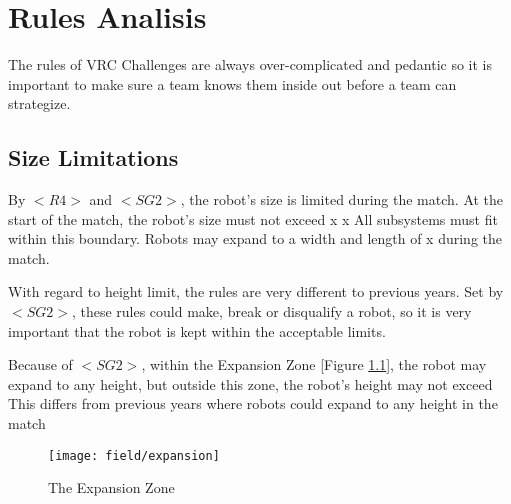 \documentclass[../main.tex]{subfiles}
\begin{document}
\chapter{Rules Analisis}

The rules of VRC Challenges are always over-complicated and pedantic
so it is important to make sure a team knows them inside out before a team can
strategize.

\section{Size Limitations}

By $<R4>$ and $<SG2>$, the robot’s size is limited during the match. 
At the start of the match, the robot’s size must not exceed  x  x  
All subsystems must fit within this boundary.
Robots may expand to a width and length of  x  during the match. \par

With regard to height limit, the rules are very different to previous years.
Set by $<SG2>$, these rules could make, break or disqualify a robot,
so it is very important that the robot is kept within the acceptable limits. \par

Because of $<SG2>$, within the Expansion Zone [Figure \ref{fig:expansionzone}], the robot may expand to any height,
but outside this zone, the robot’s height may not exceed  
This differs from previous years where robots could expand to any height in the match 
\par

\begin{figure}
    \texttt{[image: field/expansion]}
    \caption{The Expansion Zone}
   \label{fig:expansionzone}
\end{figure}
\end{document}
